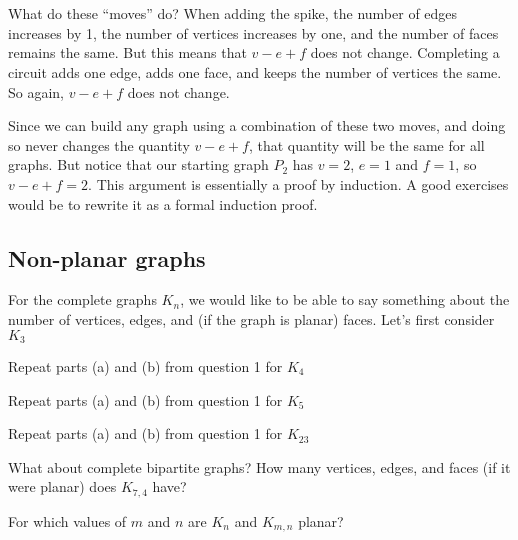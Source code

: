 \documentclass[12pt]{article}
\begin{document}
\begin{center}
  ~ \hfill
  \hfill
  \hfill ~
\end{center}

What do these ``moves'' do?  When adding the spike, the number of edges increases by 1, the number of vertices increases by one, and the number of faces remains the same.  But this means that $v - e + f$ does not change.  Completing a circuit adds one edge, adds one face, and keeps the number of vertices the same.  So again, $v - e + f$ does not change.  

Since we can build any graph using a combination of these two moves, and doing so never changes the quantity $v - e + f$, that quantity will be the same for all graphs.  But notice that our starting graph $P_2$ has $v = 2$, $e = 1$ and $f = 1$, so $v - e + f = 2$.  This argument is essentially a proof by induction.  A good exercises would be to rewrite it as a formal induction proof.

\subsection{Non-planar graphs}

\begin{activity}
\begin{questions}
\question For the complete graphs $K_n$, we would like to be able to say something about the number of vertices, edges, and (if the graph is planar) faces. Let's first consider $K_3$
\question Repeat parts (a) and (b) from question 1 for $K_4$ 

\question Repeat parts (a) and (b) from question 1 for $K_5$

\question Repeat parts (a) and (b) from question 1 for $K_{23}$


\question What about complete bipartite graphs?  How many vertices, edges, and faces (if it were planar) does $K_{7,4}$ have?

\question For which values of $m$ and $n$ are $K_n$ and $K_{m,n}$ planar?
\end{questions}
\end{activity}
\end{document}
